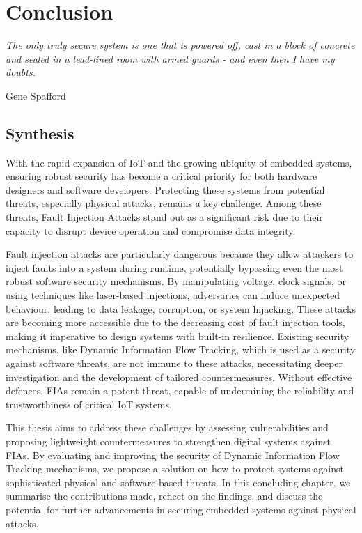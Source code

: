 \chapter{Conclusion}
\label{chapter:conclusion}

\epigraph{\textit{The only truly secure system is one that is powered off, cast in a block of concrete and sealed in a lead-lined room with armed guards - and even then I have my doubts.}}{Gene Spafford}

\minitoc

\section{Synthesis}

With the rapid expansion of IoT and the growing ubiquity of embedded systems, ensuring robust security has become a critical priority for both hardware designers and software developers. Protecting these systems from potential threats, especially physical attacks, remains a key challenge. Among these threats, Fault Injection Attacks stand out as a significant risk due to their capacity to disrupt device operation and compromise data integrity.

Fault injection attacks are particularly dangerous because they allow attackers to inject faults into a system during runtime, potentially bypassing even the most robust software security mechanisms. By manipulating voltage, clock signals, or using techniques like laser-based injections, adversaries can induce unexpected behaviour, leading to data leakage, corruption, or system hijacking. These attacks are becoming more accessible due to the decreasing cost of fault injection tools, making it imperative to design systems with built-in resilience. Existing security mechanisms, like Dynamic Information Flow Tracking, which is used as a security against software threats, are not immune to these attacks, necessitating deeper investigation and the development of tailored countermeasures. Without effective defences, FIAs remain a potent threat, capable of undermining the reliability and trustworthiness of critical IoT systems.

This thesis aims to address these challenges by assessing vulnerabilities and proposing lightweight countermeasures to strengthen digital systems against FIAs. By evaluating and improving the security of Dynamic Information Flow Tracking mechanisms, we propose a solution on how to protect systems against sophisticated physical and software-based threats. In this concluding chapter, we summarise the contributions made, reflect on the findings, and discuss the potential for further advancements in securing embedded systems against physical attacks.

